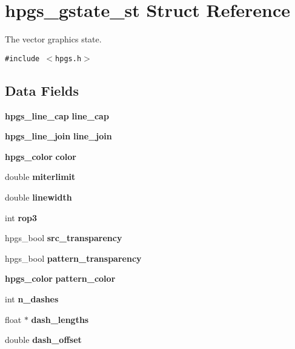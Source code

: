 \section{hpgs\_\-gstate\_\-st Struct Reference}
\label{structhpgs__gstate__st}
The vector graphics state.  


{\tt \#include $<$hpgs.h$>$}

\subsection*{Data Fields}
\begin{CompactItemize}
\item 
{\bf hpgs\_\-line\_\-cap} \textbf{line\_\-cap}\label{structhpgs__gstate__st_e9b79ad6a33b766e514345b333bd6931}

\item 
{\bf hpgs\_\-line\_\-join} \textbf{line\_\-join}\label{structhpgs__gstate__st_03588e191e3505d53cc305519cf0e380}

\item 
{\bf hpgs\_\-color} \textbf{color}\label{structhpgs__gstate__st_132fefa979e11800b5d8eda532f14b9c}

\item 
double \textbf{miterlimit}\label{structhpgs__gstate__st_92bbd003e1738f6bada4871b9063966f}

\item 
double \textbf{linewidth}\label{structhpgs__gstate__st_6d1292cbae2afafb55c79dd1f3de79f4}

\item 
int \textbf{rop3}\label{structhpgs__gstate__st_dd8f9df29bc513931825fafb5d097143}

\item 
hpgs\_\-bool \textbf{src\_\-transparency}\label{structhpgs__gstate__st_9a1a4c49e9ce54f3123ce4d2eb5817af}

\item 
hpgs\_\-bool \textbf{pattern\_\-transparency}\label{structhpgs__gstate__st_acb6ea8542981623f3d2b93a008a3925}

\item 
{\bf hpgs\_\-color} \textbf{pattern\_\-color}\label{structhpgs__gstate__st_45bef16b715311be78d822764763ecb3}

\item 
int \textbf{n\_\-dashes}\label{structhpgs__gstate__st_f651383ca35b41f0a37240753d728cd4}

\item 
float $\ast$ \textbf{dash\_\-lengths}\label{structhpgs__gstate__st_aa22013f077958d38b95145df9b17087}

\item 
double \textbf{dash\_\-offset}\label{structhpgs__gstate__st_46ca99dff28cd2de9836af61b3373a2f}

\end{CompactItemize}


